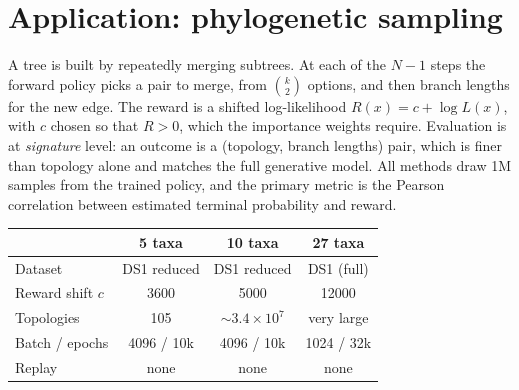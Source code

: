 \documentclass[11pt]{article}
\begin{document}
\FloatBarrier

\section{Application: phylogenetic sampling}
\label{sec:phylo}

A tree is built by repeatedly merging subtrees. At each of the $N-1$ steps the
forward policy picks a pair to merge, from $\binom{k}{2}$ options, and then
branch lengths for the new edge. The reward is a shifted log-likelihood
$R(x) = c + \log L(x)$, with $c$ chosen so that $R > 0$, which the importance
weights require. Evaluation is at \emph{signature} level: an outcome is a
(topology, branch lengths) pair, which is finer than topology alone and matches
the full generative model. All methods draw 1M samples from the trained policy,
and the primary metric is the Pearson correlation between estimated terminal
probability and reward.

\begin{center}
\begin{tabular}{lccc}
\toprule
 & 5 taxa & 10 taxa & 27 taxa \\
\midrule
Dataset        & DS1 reduced & DS1 reduced & DS1 (full) \\
Reward shift $c$ & 3600 & 5000 & 12000 \\
Topologies     & 105 & $\sim3.4\times10^{7}$ & very large \\
Batch / epochs & 4096 / 10k & 4096 / 10k & 1024 / 32k \\
Replay         & none & none & none \\
\bottomrule
\end{tabular}
\end{center}
\end{document}
